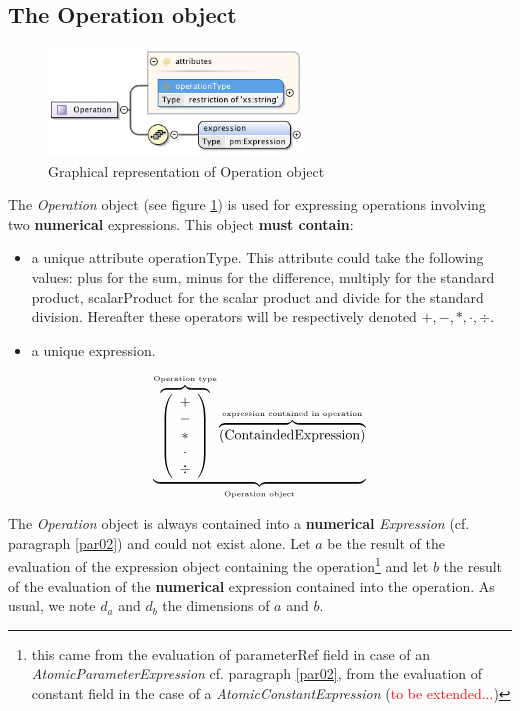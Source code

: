 \documentclass[a4paper,11pt] {article}
\begin{document}
\subsection{The Operation object}\label{par02_02}
\begin{figure}[htbp]
\begin{center}
\includegraphics[width=0.6\textwidth]{pictures/Operation.jpg} 
\caption{Graphical representation of Operation object}
\label{Pic-Operation}
\end{center}
\end{figure}

The {\it Operation} object (see figure \ref{Pic-Operation}) is used for expressing operations
involving two {\bf numerical} expressions. This object {\bf must contain}:
\begin{itemize}
\item a unique attribute operationType. This attribute could take the following values: plus for the
sum, minus for the difference, multiply for the standard product, scalarProduct for the scalar
product and divide for the standard division. Hereafter these operators will be respectively denoted
$+,-,\ast,\cdot, \div$.
\item a unique expression.
\end{itemize}
\begin{equation}\label{OperationEquation}
\underbrace{ \overbrace{\left( \begin{array}{c} + \\ - \\ \ast  \\ \cdot \\ \div   \end{array} \right) }^{\mbox{\tiny Operation type}}
 \overbrace{    \left( \mbox{ContaindedExpression}\right) }^{\mbox{\tiny expression contained in operation}}   }_{\mbox{\tiny Operation object}}
\end{equation}

The {\it Operation} object is always contained into a {\bf numerical} {\it Expression} (cf.
paragraph \ref{par02}) and could not exist alone.
Let $a$ be the result of the evaluation of the expression object containing the
operation\footnote{this came from the evaluation of parameterRef field in case of an {\it
AtomicParameterExpression} cf. paragraph \ref{par02}, from the evaluation of constant field in the
case of a {\it AtomicConstantExpression} (\textcolor{red}{to be extended...})} and let $b$ the
result of the evaluation of the {\bf numerical} expression contained into the operation. As usual,
we note $d_a$ and $d_b$ the dimensions of $a$ and $b$.\\
\end{document}
